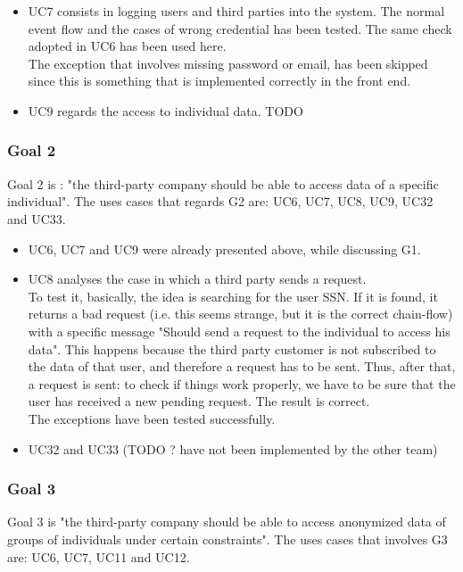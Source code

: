 \begin{itemize}
\item UC7 consists in logging users and third parties into the system. The normal event flow and the cases of wrong credential has been
tested.
The same check adopted in UC6 has been used here. \\ 
The exception that involves missing password or email, has been skipped since this is something that is implemented correctly in the front 
end.

\item UC9 regards the access to individual data.
TODO

\end{itemize}


\subsubsection{Goal 2}
Goal 2 is : "the third-party company should be able to access data of a specific individual".
The uses cases that regards G2 are: UC6, UC7, UC8, UC9, UC32 and UC33.  

\begin{itemize}
\item UC6, UC7 and UC9 were already presented above, while discussing G1.

\item UC8 analyses the case in which a third party sends a request. \\
To test it, basically, the idea is searching for the user SSN. 
If it is found, it returns a bad request (i.e. this seems strange, but it is the correct chain-flow) with a specific message "Should send a
request to the individual to access his data". This happens because the third party customer is not subscribed to the data of that user, and
therefore a request has to be sent.
Thus, after that, a request is sent: to check if things work properly, we have to be sure that the user has received a new pending request. 
The result is correct.  \\
The exceptions have been tested successfully. 

\item UC32 and UC33 (TODO ? have not been implemented by the other team) 

\end{itemize}

\subsubsection{Goal 3}
Goal 3 is "the third-party company should be able to access anonymized data of groups
of individuals under certain constraints".
The uses cases that involves G3 are: UC6, UC7, UC11 and UC12.  

